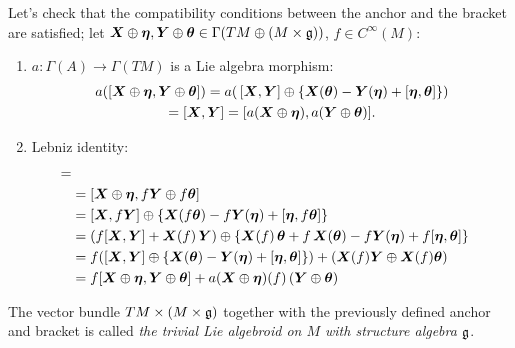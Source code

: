 Let's check that the compatibility conditions between the anchor and the bracket are satisfied; let $\bm{X} \oplus \bm{\eta}, \bm{Y} \oplus \bm{\theta} \in \Gamma(TM \oplus (M \times \mathfrak{g}))$, $f \in C^\infty(M)$:

    \begin{enumerate}
    \item $a: \Gamma(A) \to \Gamma(TM)$ is a Lie algebra morphism: 
    \begin{multline*}
    a([\bm{X} \oplus \bm{\eta}, \bm{Y} \oplus \bm{\theta}]) 
    = a(\, [\bm{X}, \bm{Y}] \oplus \{\bm{X}(\bm{\theta}) - \bm{Y}(\bm{\eta}) + [\bm{\eta}, \bm{\theta}]  \}) \\
    = [\bm{X}, \bm{Y}] 
    = [a(\bm{X} \oplus \bm{\eta}), a(\bm{Y} \oplus \bm{\theta})].    
    \end{multline*}
    
    
    \item Lebniz identity: 
    \begin{align*}
        [\sect X \oplus \sect \eta, &f\, (\sect Y \oplus \sect \theta)] =\\
        &= [\sect X \oplus \sect \eta, f\sect Y \oplus f\sect \theta] \\
        &=  [\sect X, f\sect Y] \oplus \{\sect X(f\sect \theta) - f\sect Y(\sect \eta) + [\sect \eta, f\sect \theta]\} \\
        &= (f[\sect X, \sect Y] + \sect X(f)\,\sect Y) \oplus \{\sect X(f)\,\sect \theta + f\,\sect X(\sect \theta) - f\sect Y(\sect \eta) + f[\sect \eta, \sect \theta]\} \\
        &=f([\sect X, \sect Y] \oplus \{ \sect X(\sect \theta) -\sect Y(\sect \eta) + [\sect \eta, \sect \theta]\} ) + (\sect X(f) \sect Y \oplus \sect X(f)\sect \theta) \\
        &= f[\sect X \oplus \sect \eta, \sect Y \oplus \sect \theta] + a(\sect X \oplus \sect \eta)(f) \, (\sect Y \oplus \sect \theta)
    \end{align*}
    \end{enumerate}

The vector bundle $TM \times (M \times \mathfrak{g})$ together with the previously defined anchor and bracket is called \emph{the trivial Lie algebroid on $M$ with structure algebra $\mathfrak{g}$}.






